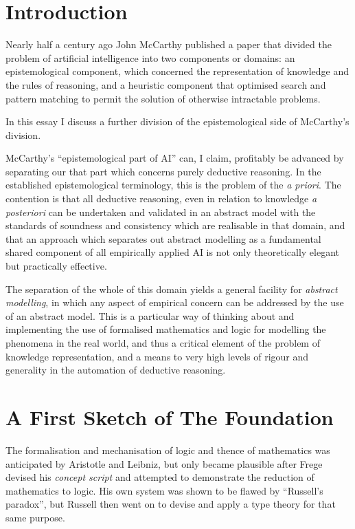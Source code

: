 \documentclass[10pt,titlepage]{book}
\begin{document}
\section{Introduction}


Nearly half a century ago John McCarthy published a paper \cite{mccarthy1981} that divided the problem of artificial intelligence into two components or domains: an epistemological component, which concerned the representation of knowledge and the rules of reasoning, and a heuristic component that optimised search and pattern matching to permit the solution of  otherwise intractable problems.

In this essay I discuss a further division of the epistemological side of McCarthy's division.

McCarthy's ``epistemological part of AI'' can, I claim, profitably be advanced by separating our that part which concerns purely deductive reasoning.
In the established epistemological terminology, this is the problem of the \emph{a priori}.
The contention is that all deductive reasoning, even in relation to knowledge \emph{a posteriori} can be undertaken and validated in an abstract model with the standards of soundness and consistency which are realisable in that domain, and that an approach which separates out  abstract modelling as a fundamental shared component of all empirically applied AI is not only theoretically elegant but practically effective.

The separation of the whole of this domain yields a general facility for \emph{abstract modelling}, in which any aspect of empirical concern can be addressed by the use of an abstract model.
This is a particular way of thinking about and implementing the use of formalised mathematics and logic for modelling the phenomena in the real world, and thus a critical element of the problem of knowledge representation, and a means to very high levels of rigour and generality in the automation of deductive reasoning.

\section{A First Sketch of The Foundation}

The formalisation and mechanisation of logic and thence of mathematics was anticipated by Aristotle and Leibniz, but only became plausible after Frege devised his \emph{concept script} and attempted to demonstrate the reduction of mathematics to logic.
His own system was shown to be flawed by ``Russell's paradox'', but Russell then went on to devise and apply a type theory for that same purpose.
\end{document}
